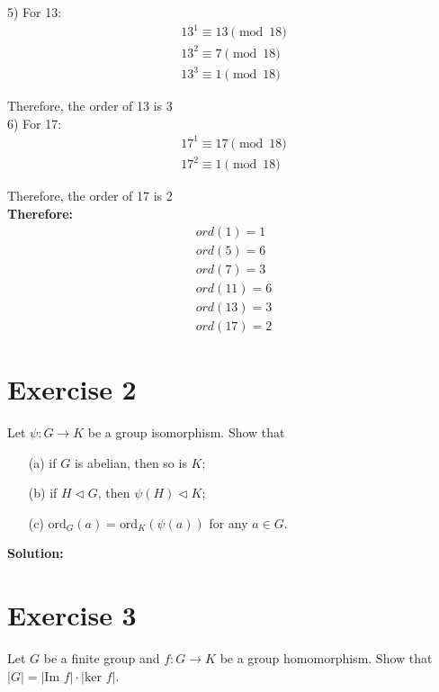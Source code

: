 \documentclass{article}
\begin{document}
5) For 13:
\begin{align*}
   13^1 \equiv 13 \pmod{18} \\
   13^2 \equiv 7 \pmod{18} \\
   13^3 \equiv 1 \pmod{18}
\end{align*}

Therefore, the order of 13 is 3 \\

6) For 17:
\begin{align*}
   17^1 \equiv 17 \pmod{18} \\
   17^2 \equiv 1 \pmod{18}
\end{align*}

Therefore, the order of 17 is 2 \\

\textbf{Therefore:}
\begin{align*}
    ord(1) = 1 \\
    ord(5) = 6 \\
    ord(7) = 3 \\
    ord(11) = 6 \\
    ord(13) = 3 \\
    ord(17) = 2
\end{align*}

\newpage

\section*{Exercise 2}
Let $\psi: G \to K$ be a group isomorphism. Show that
\begin{itemize}
\item[(a)] if $G$ is abelian, then so is $K$;
\item[(b)] if $H \triangleleft G$, then $\psi(H) \triangleleft K$;
\item[(c)] $\text{ord}_G(a) = \text{ord}_K(\psi(a))$ for any $a \in G$.
\end{itemize}

\textbf{Solution:} \\



\newpage

\section*{Exercise 3}
Let $G$ be a finite group and $f: G \to K$ be a group homomorphism. Show that $|G| = |\text{Im } f| \cdot |\text{ker } f|$. \\
\end{document}
